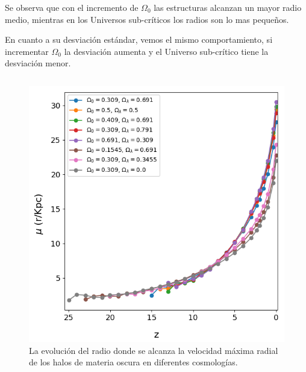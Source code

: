 \documentclass{beamer}
\begin{document}
	\begin{frame}
		 {\small Se observa que con el incremento de $\Omega_0$ las estructuras alcanzan un mayor radio medio, mientras en los Universos sub-críticos los radios son lo mas pequeños. }

		 {\small En cuanto a su desviación estándar, vemos el mismo comportamiento, si incrementar $\Omega_0$ la desviación aumenta y el Universo sub-crítico tiene la desviación menor.}
		
		\begin{columns}[t]
			\begin{column}{.5\textwidth}
				\begin{figure}
					\centering
					\includegraphics[scale=0.27]{Conc/VMaxRad_Mean_Conc.png}
					\caption{\footnotesize La evolución del radio donde se alcanza la velocidad máxima radial de los halos de materia oscura en diferentes cosmologías.}
					\label{fig:Conc-VMAxRadMean}
				\end{figure}
			\end{column}


\end{columns}
\end{frame}
\end{document}
